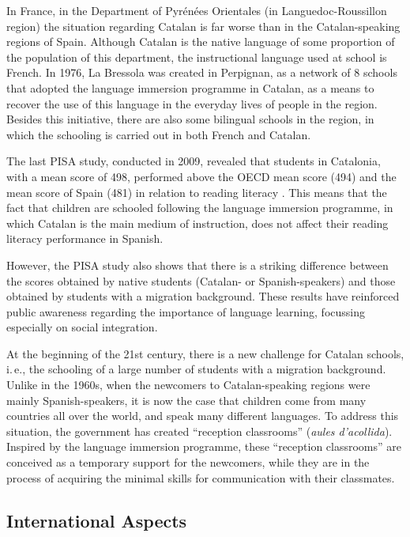 \begin{multicols}{2}
In France, in the Department of Pyrénées Orientales (in Languedoc-Roussillon region) the situation regarding Catalan is far worse than in the Catalan-speaking regions of Spain. Although Catalan is the native language of some proportion of the population of this department, the instructional language used at school is French. In 1976, La Bressola \cite{CAT-Nota6} was created in Perpignan, as a network of 8 schools that adopted the language immersion programme in Catalan, as a means to recover the use of this language in the everyday lives of people in the region. Besides this initiative, there are also some bilingual schools in the region, in which the schooling is carried out in both French and Catalan.

The last PISA study, conducted in 2009, revealed that students in Catalonia, with a mean score of 498, performed above the OECD mean score (494) and the mean score of Spain (481) in relation to reading literacy \cite{CAT-Nota7}. This means that the fact that children are schooled following the language immersion programme, in which Catalan is the main medium of instruction, does not affect their reading literacy performance in Spanish.

However, the PISA study also shows that there is a striking difference between the scores obtained by native students (Catalan- or Spanish-speakers) and those obtained by students with a migration background. These results have reinforced public awareness regarding the importance of language learning, focussing especially on social integration.

At the beginning of the 21st century, there is a new challenge for Catalan schools, i.\,e., the schooling of a large number of students with a migration background. Unlike in the 1960s, when the newcomers to Catalan-speaking regions were mainly Spanish-speakers, it is now the case that children come from many countries all over the world, and speak many different languages. To address this situation, the government has created “reception classrooms” (\textit{aules d’acollida}). Inspired by the language immersion programme, these “reception classrooms” are conceived as a temporary support for the newcomers, while they are in the process of acquiring the minimal skills for communication with their classmates.

\subsection{International Aspects}


\end{multicols}
